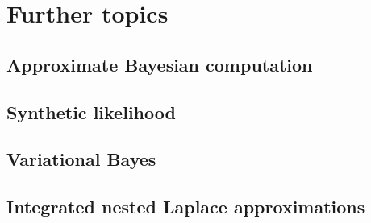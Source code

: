 \chapter{Further topics}\label{chap15}

\section{Approximate Bayesian computation}\label{sec15_1}

\section{Synthetic likelihood}\label{sec15_2}

\section{Variational Bayes}\label{sec15_3}

\section{Integrated nested Laplace approximations}\label{sec15_4}

